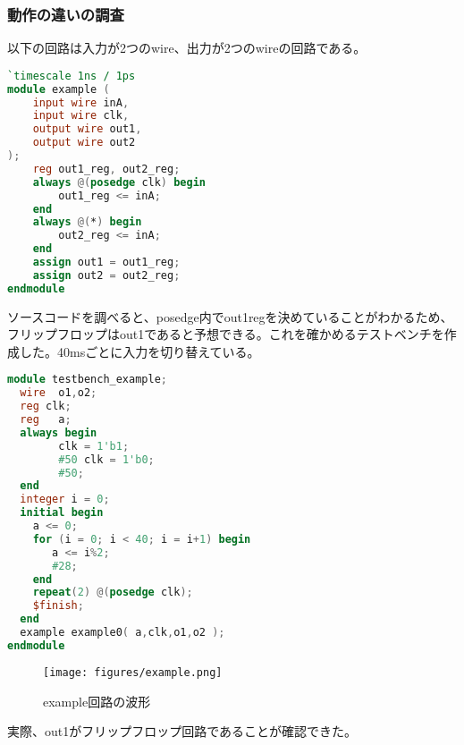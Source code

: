 \documentclass{ltjsarticle}
\begin{document}
\subsubsection{動作の違いの調査}
以下の回路は入力が2つのwire、出力が2つのwireの回路である。
\begin{lstlisting}[caption=*****,language=verilog]
`timescale 1ns / 1ps
module example (
    input wire inA,
    input wire clk,
    output wire out1,
    output wire out2
);
    reg out1_reg, out2_reg;
    always @(posedge clk) begin
        out1_reg <= inA;
    end
    always @(*) begin
        out2_reg <= inA;
    end
    assign out1 = out1_reg;
    assign out2 = out2_reg;
endmodule
\end{lstlisting}
ソースコードを調べると、posedge内でout1regを決めていることがわかるため、フリップフロップはout1であると予想できる。これを確かめるテストベンチを作成した。40msごとに入力を切り替えている。
\begin{lstlisting}[caption=*****,language=verilog]
module testbench_example;
  wire	o1,o2;
  reg clk;
  reg	a;
  always begin
        clk = 1'b1;
        #50 clk = 1'b0;
        #50;
  end
  integer i = 0;
  initial begin
	a <= 0;
	for (i = 0; i < 40; i = i+1) begin
	   a <= i%2;
	   #28;
	end
	repeat(2) @(posedge clk);
	$finish;
  end
  example example0( a,clk,o1,o2 );
endmodule
\end{lstlisting}
\begin{figure}[H]
    \begin{center}
        \texttt{[image: figures/example.png]}
        \caption{example回路の波形}
    \end{center}
\end{figure}
実際、out1がフリップフロップ回路であることが確認できた。
\end{document}
